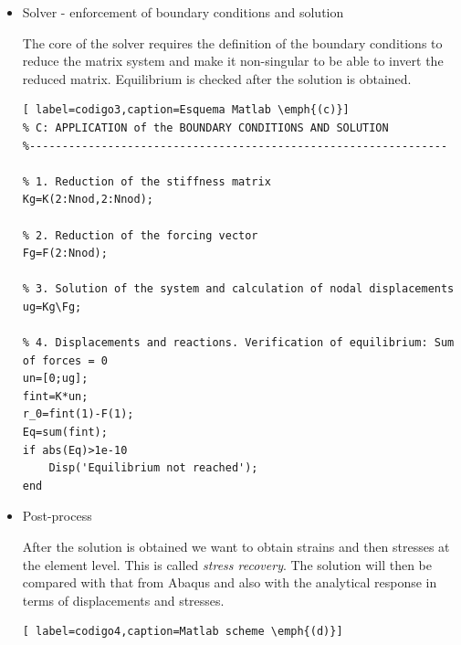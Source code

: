 \documentclass[spanish,a4paper,12pt]{article}
\begin{document}
\begin{itemize}
\begin{lstlisting}[ label=codigo2,caption=Matlab scheme \emph{(b)}]
% 1. Elementary stiffness matrix (the same for all elements)
k=(E*A/h)*[1,-1;-1,1];  

% 2. Assembly to obtain the global stiffness matrix (note capital letter in K)
for i=1:Nele
    K(i:i+1,i:i+1)=K(i:i+1,i:i+1)+k;        % Assembly
end

% 3. Assembly of the forcing vector (note capital letter in F)
for i=1:Nele
    % elementary vector of distributed forces
    fvol=(h/6)*[2*q(i)+q(i+1);q(i)+2*q(i+1)];
    % Assembly of loads
    F(i:i+1)=F(i:i+1)+fvol;                    
end

% 4. Sum of external forces
Fext(Nnod)=Fext(Nnod)+P;
F=F+Fext;           % Sum of forces at the ends and also distributed along the bar
\end{lstlisting}

\item Solver - enforcement of boundary conditions and solution

The core of the solver requires the definition of the boundary conditions to reduce the matrix system and make it non-singular to be able to invert the reduced matrix. Equilibrium is checked after the solution is obtained.


\begin{lstlisting}[ label=codigo3,caption=Esquema Matlab \emph{(c)}]
% C: APPLICATION of the BOUNDARY CONDITIONS AND SOLUTION
%----------------------------------------------------------------

% 1. Reduction of the stiffness matrix
Kg=K(2:Nnod,2:Nnod);

% 2. Reduction of the forcing vector
Fg=F(2:Nnod);

% 3. Solution of the system and calculation of nodal displacements
ug=Kg\Fg;

% 4. Displacements and reactions. Verification of equilibrium: Sum of forces = 0
un=[0;ug];
fint=K*un;
r_0=fint(1)-F(1);
Eq=sum(fint);
if abs(Eq)>1e-10
    Disp('Equilibrium not reached');
end
\end{lstlisting}

\item Post-process

After the solution is obtained we want to obtain strains and then stresses at the element level. This is called \emph{stress recovery}. The solution will then be compared with that from Abaqus and also with the analytical response in terms of displacements and stresses.

\begin{lstlisting}[ label=codigo4,caption=Matlab scheme \emph{(d)}]


\end{lstlisting}
\end{itemize}
\end{document}
